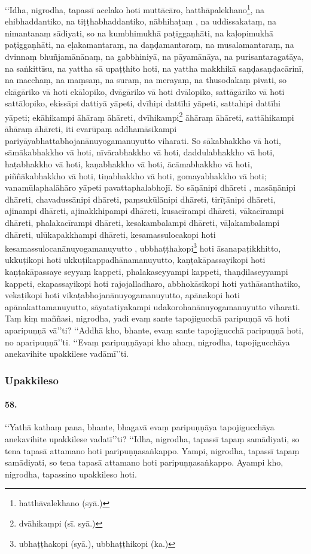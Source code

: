 ‘‘Idha, nigrodha, tapassī acelako hoti muttācāro, hatthāpalekhano\footnote{hatthāvalekhano (syā.)}, na ehibhaddantiko, na tiṭṭhabhaddantiko, nābhihaṭaṃ , na uddissakataṃ, na nimantanaṃ sādiyati, so na kumbhimukhā paṭiggaṇhāti, na kaḷopimukhā paṭiggaṇhāti, na eḷakamantaraṃ, na daṇḍamantaraṃ, na musalamantaraṃ, na dvinnaṃ bhuñjamānānaṃ, na gabbhiniyā, na pāyamānāya, na purisantaragatāya, na saṅkittīsu, na yattha sā upaṭṭhito hoti, na yattha makkhikā saṇḍasaṇḍacārinī, na macchaṃ, na maṃsaṃ, na suraṃ, na merayaṃ, na thusodakaṃ pivati, so ekāgāriko vā hoti ekālopiko, dvāgāriko vā hoti dvālopiko, sattāgāriko vā hoti sattālopiko, ekissāpi dattiyā yāpeti, dvīhipi dattīhi yāpeti, sattahipi dattīhi yāpeti; ekāhikampi āhāraṃ āhāreti, dvīhikampi\footnote{dvāhikaṃpi (sī. syā.)} āhāraṃ āhāreti, sattāhikampi āhāraṃ āhāreti, iti evarūpaṃ addhamāsikampi pariyāyabhattabhojanānuyogamanuyutto viharati. So sākabhakkho vā hoti, sāmākabhakkho vā hoti, nīvārabhakkho vā hoti, daddulabhakkho vā hoti, haṭabhakkho vā hoti, kaṇabhakkho vā hoti, ācāmabhakkho vā hoti, piññākabhakkho vā hoti, tiṇabhakkho vā hoti, gomayabhakkho vā hoti; vanamūlaphalāhāro yāpeti pavattaphalabhojī. So sāṇānipi dhāreti , masāṇānipi dhāreti, chavadussānipi dhāreti, paṃsukūlānipi dhāreti, tirīṭānipi dhāreti, ajinampi dhāreti, ajinakkhipampi dhāreti, kusacīrampi dhāreti, vākacīrampi dhāreti, phalakacīrampi dhāreti, kesakambalampi dhāreti, vāḷakambalampi dhāreti, ulūkapakkhampi dhāreti, kesamassulocakopi hoti kesamassulocanānuyogamanuyutto , ubbhaṭṭhakopi\footnote{ubhaṭṭhakopi (syā.), ubbhaṭṭhikopi (ka.)} hoti āsanapaṭikkhitto, ukkuṭikopi hoti ukkuṭikappadhānamanuyutto, kaṇṭakāpassayikopi hoti kaṇṭakāpassaye seyyaṃ kappeti, phalakaseyyampi kappeti, thaṇḍilaseyyampi kappeti, ekapassayikopi hoti rajojalladharo, abbhokāsikopi hoti yathāsanthatiko, vekaṭikopi hoti vikaṭabhojanānuyogamanuyutto, apānakopi hoti apānakattamanuyutto, sāyatatiyakampi udakorohanānuyogamanuyutto viharati. Taṃ kiṃ maññasi, nigrodha, yadi evaṃ sante tapojigucchā paripuṇṇā vā hoti aparipuṇṇā vā’’ti? ‘‘Addhā kho, bhante, evaṃ sante tapojigucchā paripuṇṇā hoti, no aparipuṇṇā’’ti. ‘‘Evaṃ paripuṇṇāyapi kho ahaṃ, nigrodha, tapojigucchāya anekavihite upakkilese vadāmī’’ti.

\subsubsection{Upakkileso}

\paragraph{58.} ‘‘Yathā kathaṃ pana, bhante, bhagavā evaṃ paripuṇṇāya tapojigucchāya anekavihite upakkilese vadatī’’ti? ‘‘Idha, nigrodha, tapassī tapaṃ samādiyati, so tena tapasā attamano hoti paripuṇṇasaṅkappo. Yampi, nigrodha, tapassī tapaṃ samādiyati, so tena tapasā attamano hoti paripuṇṇasaṅkappo. Ayampi kho, nigrodha, tapassino upakkileso hoti.

